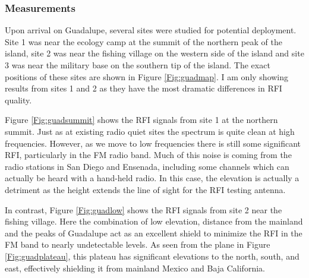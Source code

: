 \subsubsection{Measurements}

Upon arrival on Guadalupe, several sites were studied for potential deployment. Site 1 was near the ecology camp at the summit of the northern peak of the island, site 2 was near the fishing village on the western side of the island and site 3 was near the military base on the southern tip of the island. The exact positions of these sites are shown in Figure \ref{Fig:guadmap}. I am only showing results from sites 1 and 2 as they have the most dramatic differences in RFI quality. 

Figure \ref{Fig:guadsummit} shows the RFI signals from site 1 at the northern summit. Just as at existing radio quiet sites the spectrum is quite clean at high frequencies. However, as we move to low frequencies there is still some significant RFI, particularly in the FM radio band. Much of this noise is coming from the radio stations in San Diego and Ensenada, including some channels which can actually be heard with a hand-held radio. In this case, the elevation is actually a detriment as the height extends the line of sight for the RFI testing antenna. 

In contrast, Figure \ref{Fig:guadlow} shows the RFI signals from site 2 near the fishing village. Here the combination of low elevation, distance from the mainland and the peaks of Guadalupe act as an excellent shield to minimize the RFI in the FM band to nearly undetectable levels. As seen from the plane in Figure \ref{Fig:guadplateau}, this plateau has significant elevations to the north, south, and east, effectively shielding it from mainland Mexico and Baja California. 

